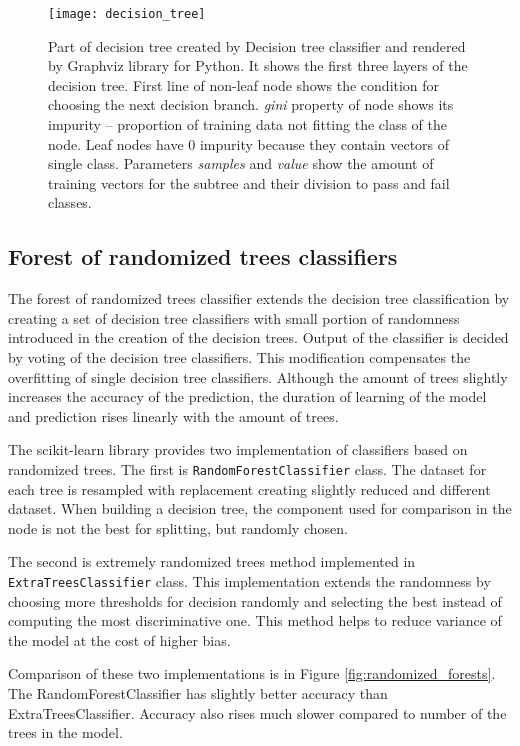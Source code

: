 \begin{figure}
  \centering
  \texttt{[image: decision\_tree]}
  \caption{Part of decision tree created by Decision tree classifier and
    rendered by Graphviz library for Python. It shows the first three layers of the
    decision tree. First line of non-leaf node shows the condition for choosing
    the next decision branch. \emph{gini} property of node shows its impurity --
    proportion of training data not fitting the class of the node. Leaf nodes
    have 0 impurity because they contain vectors of single class. Parameters
    \emph{samples} and \emph{value} show the amount of training vectors for the
    subtree and their division to pass and fail classes.}
  \label{fig:decision_tree}
\end{figure}

\subsection{Forest of randomized trees classifiers}
The forest of randomized trees classifier extends the decision tree
classification by creating a set of decision tree classifiers with small portion
of randomness introduced in the creation of the decision trees. Output of the
classifier is decided by voting of the decision tree classifiers. This
modification compensates the overfitting of single decision tree classifiers.
Although the amount of trees slightly increases the accuracy of the prediction,
the duration of learning of the model and prediction rises linearly with the
amount of trees.

The scikit-learn library provides two implementation of classifiers based on
randomized trees. The first is \texttt{RandomForestClassifier} class. The
dataset for each tree is resampled with replacement creating slightly reduced
and different dataset. When building a decision tree, the component used for
comparison in the node is not the best for splitting, but randomly chosen.

The second is extremely randomized trees method implemented in
\texttt{ExtraTreesClassifier} class. This implementation extends the randomness
by choosing more thresholds for decision randomly and selecting the best instead
of computing the most discriminative one. This method helps to reduce variance
of the model at the cost of higher bias.

Comparison of these two implementations is in Figure
\ref{fig:randomized_forests}. The RandomForestClassifier has slightly better
accuracy than ExtraTreesClassifier. Accuracy also rises much slower compared to
number of the trees in the model.

